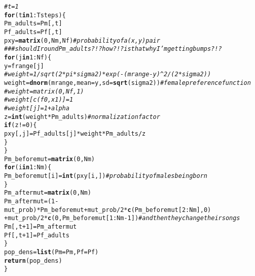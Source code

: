 \documentclass{article}\usepackage[]{graphicx}\usepackage[]{color}
\makeatletter
\newcommand{\hlnum}[1]{\textcolor[rgb]{0.686,0.059,0.569}{#1}}%
\newcommand{\hlcom}[1]{\textcolor[rgb]{0.678,0.584,0.686}{\textit{#1}}}%
\newcommand{\hlopt}[1]{\textcolor[rgb]{0,0,0}{#1}}%
\newcommand{\hlstd}[1]{\textcolor[rgb]{0.345,0.345,0.345}{#1}}%
\newcommand{\hlkwa}[1]{\textcolor[rgb]{0.161,0.373,0.58}{\textbf{#1}}}%
\newcommand{\hlkwb}[1]{\textcolor[rgb]{0.69,0.353,0.396}{#1}}%
\newcommand{\hlkwc}[1]{\textcolor[rgb]{0.333,0.667,0.333}{#1}}%
\newcommand{\hlkwd}[1]{\textcolor[rgb]{0.737,0.353,0.396}{\textbf{#1}}}%
\newenvironment{kframe}{%
 \def\at@end@of@kframe{}%
 \ifinner\ifhmode%
  \def\at@end@of@kframe{\end{minipage}}%
  \begin{minipage}{\columnwidth}%
 \fi\fi%
 \def\FrameCommand##1{\hskip\@totalleftmargin \hskip-\fboxsep
 \colorbox{shadecolor}{##1}\hskip-\fboxsep
     \hskip-\linewidth \hskip-\@totalleftmargin \hskip\columnwidth}%
 \MakeFramed {\advance\hsize-\width
   \@totalleftmargin\z@ \linewidth\hsize
   \@setminipage}}%
 {\par\unskip\endMakeFramed%
 \at@end@of@kframe}
\newenvironment{knitrout}{}{} %
\makeatother
\begin{document}
\begin{knitrout}
\begin{kframe}
\begin{alltt}
\hlcom{# t = 1}
\hlkwa{for}\hlstd{(t} \hlkwa{in} \hlnum{1}\hlopt{:}\hlstd{Tsteps)\{}
        \hlstd{Pm_adults} \hlkwb{=} \hlstd{Pm[,t]}
        \hlstd{Pf_adults} \hlkwb{=} \hlstd{Pf[,t]}
        \hlstd{pxy} \hlkwb{=} \hlkwd{matrix}\hlstd{(}\hlnum{0}\hlstd{,Nm,Nf)} \hlcom{#probability of a (x,y) pair}
        \hlcom{### should I round Pm_adults?!? how?!? is that why I'm getting bumps?!?}
        \hlkwa{for}\hlstd{(j} \hlkwa{in} \hlnum{1}\hlopt{:}\hlstd{Nf)\{}
                \hlstd{y} \hlkwb{=} \hlstd{frange[j]}
                \hlcom{# weight = 1/sqrt(2*pi*sigma2)*exp(-(mrange-y)^2/(2*sigma2))}
                \hlstd{weight} \hlkwb{=} \hlkwd{dnorm}\hlstd{(mrange,}\hlkwc{mean}\hlstd{=y,}\hlkwc{sd}\hlstd{=}\hlkwd{sqrt}\hlstd{(sigma2))} \hlcom{#female preference function}
                \hlcom{# weight = matrix (0,Nf,1)}
                \hlcom{# weight[c(f0,x1)] = 1}
                \hlcom{# weight[j] = 1+alpha}
                \hlstd{z} \hlkwb{=} \hlkwd{int}\hlstd{(weight}\hlopt{*}\hlstd{Pm_adults)} \hlcom{#normalization factor}
                \hlkwa{if}\hlstd{(z}\hlopt{!=}\hlnum{0}\hlstd{)\{}
                        \hlstd{pxy[,j]} \hlkwb{=} \hlstd{Pf_adults[j]}\hlopt{*}\hlstd{weight}\hlopt{*}\hlstd{Pm_adults}\hlopt{/}\hlstd{z}
                        \hlstd{\}}
        \hlstd{\}}
        \hlstd{Pm_beforemut} \hlkwb{=} \hlkwd{matrix}\hlstd{(}\hlnum{0}\hlstd{,Nm)}
        \hlkwa{for}\hlstd{(i} \hlkwa{in} \hlnum{1}\hlopt{:}\hlstd{Nm)\{}
                \hlstd{Pm_beforemut[i]} \hlkwb{=} \hlkwd{int}\hlstd{(pxy[i,])} \hlcom{#probability of males being born}
        \hlstd{\}}
        \hlstd{Pm_aftermut} \hlkwb{=} \hlkwd{matrix}\hlstd{(}\hlnum{0}\hlstd{,Nm)}
        \hlstd{Pm_aftermut} \hlkwb{=} \hlstd{(}\hlnum{1}\hlopt{-}\hlstd{mut_prob)}\hlopt{*}\hlstd{Pm_beforemut} \hlopt{+} \hlstd{mut_prob}\hlopt{/}\hlnum{2}\hlopt{*}\hlkwd{c}\hlstd{(Pm_beforemut[}\hlnum{2}\hlopt{:}\hlstd{Nm],}\hlnum{0}\hlstd{)}
                \hlopt{+} \hlstd{mut_prob}\hlopt{/}\hlnum{2}\hlopt{*}\hlkwd{c}\hlstd{(}\hlnum{0}\hlstd{,Pm_beforemut[}\hlnum{1}\hlopt{:}\hlstd{Nm}\hlopt{-}\hlnum{1}\hlstd{])} \hlcom{#and then they change their songs}
        \hlstd{Pm[,t}\hlopt{+}\hlnum{1}\hlstd{]} \hlkwb{=} \hlstd{Pm_aftermut}
        \hlstd{Pf[,t}\hlopt{+}\hlnum{1}\hlstd{]} \hlkwb{=} \hlstd{Pf_adults}
\hlstd{\}}
\hlstd{pop_dens} \hlkwb{=} \hlkwd{list}\hlstd{(}\hlkwc{Pm}\hlstd{=Pm,}\hlkwc{Pf}\hlstd{=Pf)}
\hlkwd{return}\hlstd{(pop_dens)}
\hlstd{\}}
\end{alltt}
\end{kframe}
\end{knitrout}
\end{document}
